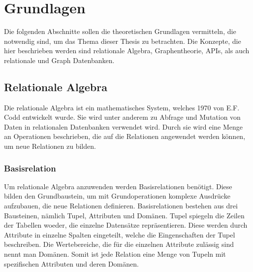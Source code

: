 \chapter{Grundlagen} %
\label{sec:grundlagen}
Die folgenden Abschnitte sollen die theoretischen Grundlagen vermitteln, die notwendig sind, um das Thema dieser Thesis zu betrachten. Die Konzepte, die hier beschrieben werden sind relationale Algebra, Graphentheorie, APIs, als auch relationale und Graph Datenbanken.
\section{Relationale Algebra} %
\label{sec:relationaleAlgebra}
Die relationale Algebra ist ein mathematisches System, welches 1970 von E.F. Codd entwickelt wurde. Sie wird unter anderem zu Abfrage und Mutation von Daten in relationalen Datenbanken verwendet wird. Durch sie wird eine Menge an Operationen beschrieben, die auf die Relationen angewendet werden können, um neue Relationen zu bilden. \citep{rdb}

\subsection{Basisrelation} %
\label{sec:basisrelation}
Um relationale Algebra anzuwenden werden Basisrelationen benötigt. Diese bilden den Grundbaustein, um mit Grundoperationen komplexe Ausdrücke aufzubauen, die neue Relationen definieren. Basisrelationen bestehen aus drei Bausteinen, nämlich Tupel, Attributen und Domänen. Tupel spiegeln die Zeilen der Tabellen woeder, die einzelne Datensätze repräsentieren. Diese werden durch Attribute in einzelne Spalten eingeteilt, welche die Eingenschaften der Tupel beschreiben. Die Wertebereiche, die für die einzelnen Attribute zulässig sind nennt man Domänen. Somit ist jede Relation eine Menge von Tupeln mit spezifischen Attributen und deren Domänen. \citep{rdb}

